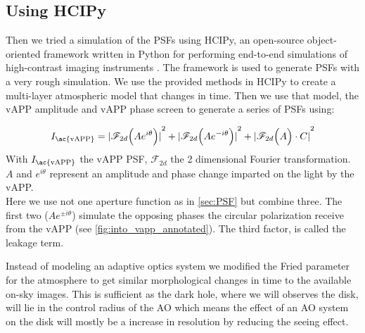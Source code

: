 \subsection{Using HCIPy}
\label{sec:hcipy}
Then we tried a simulation of the  \acp{PSF} using \ac{HCIPy}, an open-source object-oriented framework written in Python for performing end-to-end simulations of high-contrast imaging instruments \cite{hcipy}. The framework is used to generate \acp{PSF} with a very rough simulation. We use the provided methods in \ac{HCIPy} to create a multi-layer atmospheric model that changes in time. Then we use that model, the \ac{vAPP} amplitude and \ac{vAPP} phase screen to generate a series of \acp{PSF} using:

\begin{equation}
I_\text{\ac{vAPP}} = {\mathopen| \mathscr{F}_{2d}\Big( Ae^{i\theta}\Big) \mathclose|}^2 + {\mathopen| \mathscr{F}_{2d}\Big( Ae^{-i\theta}\Big) \mathclose|}^2 + {\mathopen| \mathscr{F}_{2d}\Big( A \Big) \cdot C \mathclose|}^2
\end{equation}
With $I_\text{\ac{vAPP}}$ the \ac{vAPP} \ac{PSF}, $\mathscr{F}_{2d}$ the 2 dimensional Fourier transformation. $A$ and $e^{i\theta}$ represent an amplitude and phase change imparted on the light by the \ac{vAPP}.\\

Here we use not one aperture function as in \autoref{sec:PSF} but combine three. The first two ($Ae^{\pm i\theta}$) simulate the opposing phases the circular polarization receive from the \ac{vAPP} (see \autoref{fig:into_vapp_annotated}). The third factor, is called the leakage term.

Instead of modeling an adaptive optics system we modified the Fried parameter for the atmosphere to get similar morphological changes in time to the available on-sky images. This is sufficient as the dark hole, where we will observes the disk, will lie in the control radius of the \ac{AO} which means the effect of an \ac{AO} system on the disk will mostly be a increase in resolution by reducing the seeing effect.

